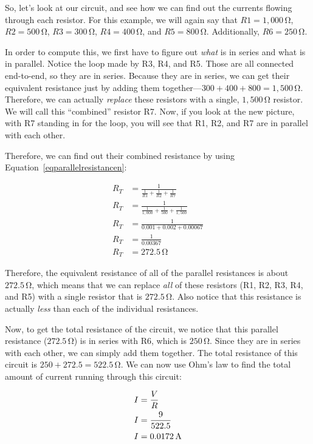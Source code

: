 So, let's look at our circuit, and see how we can find out the currents flowing through each resistor.
For this example, we will again say that $R1 = 1,000\,\si{\ohm}$, $R2 = 500\,\si{\ohm}$, $R3 = 300\,\si{\ohm}$, $R4 = 400\,\si{\ohm}$, and $R5 = 800\,\si{\ohm}$.  Additionally, $R6 = 250\,\si{\ohm}$.

In order to compute this, we first have to figure out \emph{what} is in series and what is in parallel.
Notice the loop made by R3, R4, and R5.  
Those are all connected end-to-end, so they are in series.
Because they are in series, we can get their equivalent resistance just by adding them together---$300 + 400 + 800 = 1,500\,\si{\ohm}$.
Therefore, we can actually \emph{replace} these resistors with a single, $1,500\,\si{\ohm}$ resistor.
We will call this ``combined'' resistor R7.
Now, if you look at the new picture, with R7 standing in for the loop, you will see that R1, R2, and R7 are in parallel with each other.

Therefore, we can find out their combined resistance by using Equation~\ref{eqparallelresistancen}:

\begin{align*}
R_T &= \frac{1}{\frac{1}{R1} + \frac{1}{R2} + \frac{1}{R7}} \\
R_T &= \frac{1}{\frac{1}{1,000} + \frac{1}{500} + \frac{1}{1,500}} \\
R_T &= \frac{1}{0.001 + 0.002 + 0.00067} \\
R_T &= \frac{1}{0.00367} \\
R_T &= 272.5\,\si{\ohm}
\end{align*}

Therefore, the equivalent resistance of all of the parallel resistances is about $272.5\,\si{\ohm}$, which means that we can replace \emph{all} of these resistors (R1, R2, R3, R4, and R5) with a single resistor that is $272.5\,\si{\ohm}$.
Also notice that this resistance is actually \emph{less} than each of the individual resistances.

Now, to get the total resistance of the circuit, we notice that this parallel resistance ($272.5\,\si{\ohm}$) is in series with R6, which is $250\,\si{\ohm}$.  
Since they are in series with each other, we can simply add them together.
The total resistance of this circuit is $250 + 272.5 = 522.5\,\si{\ohm}$.
We can now use Ohm's law to find the total amount of current running through this circuit:

\begin{align*}
I &= \frac{V}{R} \\
I &= \frac{9}{522.5} \\
I &= 0.0172\,\si{\ampere}
\end{align*}

